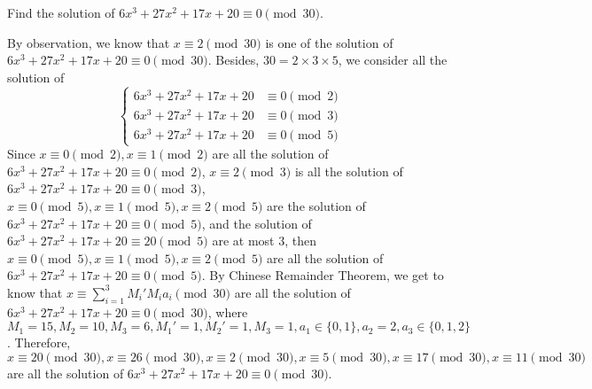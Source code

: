 \documentclass{ctexart}
\newif\ifpreface
\begin{document}
\large
\setlength{\baselineskip}{1.2em}
\ifpreface

\else
{}
\begin{problem}\label{pro:1}
  Find the solution of \(6x^3 + 27 x^2 + 17x + 20 \equiv 0 \pmod{ 30}\).
\end{problem}
\begin{solution}
  By observation, we know that \(x \equiv 2 \pmod{30}\) is one of the solution of \(6x^3 + 27 x^2 + 17 x + 20 \equiv 0 \pmod{30}\).
  Besides, \(30=2\times3\times5\), we consider all the solution of
  \[
    \begin{cases}
      6x^3 + 27x^2 + 17x + 20 & \equiv 0 \pmod{2} \\
      6x^3 + 27x^2 + 17x + 20 & \equiv 0 \pmod{3} \\
      6x^3 + 27x^2 + 17x + 20 & \equiv 0 \pmod{5}
    \end{cases}
  \]
  Since \(x \equiv 0 \pmod{2}, x \equiv 1 \pmod{2}\) are all the solution of \(6x^3 + 27x^2 + 17x + 20 \equiv 0 \pmod{2}\),
  \(x \equiv 2 \pmod{3}\) is all the solution of \(6x^3 + 27 x^2 + 17 x + 20 \equiv 0 \pmod{3}\),
  \(x \equiv 0 \pmod{5}, x \equiv 1 \pmod{5}, x \equiv 2 \pmod{5}\) are the solution of \(6x^3 + 27 x^2 + 17x + 20 \equiv 0 \pmod{5}\),
  and the solution of \(6x^3 + 27x^2 + 17x + 20 \equiv 20 \pmod{5}\) are at most \(3\),
  then \(x \equiv 0 \pmod{5}, x \equiv 1 \pmod{5}, x \equiv 2 \pmod{5}\) are all the solution of \(6x^3 + 27x^2 + 17x + 20 \equiv 0 \pmod{5}\).
  By Chinese Remainder Theorem, we get to know that \(x \equiv \sum_{i=1}^{3} M_i' M_i a_i \pmod{30}\) are all the
  solution of \(6x^3 + 27x^2 + 17x + 20 \equiv 0 \pmod{30}\), where \(M_1=15,M_2=10,M_3=6,M_1' = 1,M_2'= 1,M_3=1,a_1 \in \{0,1\},a_2
  =2, a_3 \in \{0,1,2\}\).
  Therefore, \(x \equiv 20 \pmod{30}, x \equiv 26 \pmod{30}, x \equiv 2 \pmod{30}, x \equiv 5 \pmod{30},
  x \equiv 17 \pmod{30}, x \equiv 11 \pmod{30}\) are all the solution of \(6x^3 + 27 x^2 + 17x + 20 \equiv 0 \pmod{30}\).
\end{solution}
\end{document}
